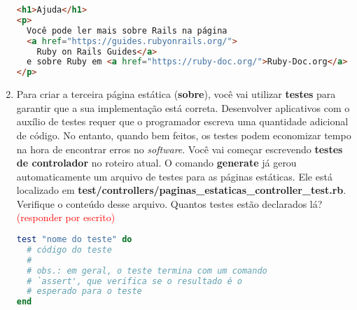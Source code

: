 \documentclass[a4paper,12pt]{article}
\begin{document}
\begin{enumerate}
  \pagebreak

  \begin{lstlisting}[language=html, title=app/views/paginas\_estaticas/ajuda.html.erb, basicstyle=\scriptsize]
<h1>Ajuda</h1>
<p>
  Você pode ler mais sobre Rails na página
  <a href="https://guides.rubyonrails.org/">
    Ruby on Rails Guides</a>
  e sobre Ruby em <a href="https://ruby-doc.org/">Ruby-Doc.org</a>
</p>
  \end{lstlisting}

  \item Para criar a terceira página estática (\textbf{sobre}), você vai utilizar \textbf{testes} para garantir que a sua implementação está correta. Desenvolver aplicativos com o auxílio de testes requer que o programador escreva uma quantidade adicional de código. No entanto, quando bem feitos, os testes podem economizar tempo na hora de encontrar erros no \textit{software}. Você vai começar escrevendo \textbf{testes de controlador} no roteiro atual. O comando \textbf{generate} já gerou automaticamente um arquivo de testes para as páginas estáticas. Ele está localizado em \textbf{test/controllers/paginas\_estaticas\_controller\_test.rb}. Verifique o conteúdo desse arquivo. Quantos testes estão declarados lá? \textcolor{red}{(responder por escrito)}

  \begin{lstlisting}[language=Ruby, title=Formato genérico para declaração de um teste]
test "nome do teste" do
  # código do teste
  #
  # obs.: em geral, o teste termina com um comando
  # `assert', que verifica se o resultado é o
  # esperado para o teste
end
  \end{lstlisting}


\end{enumerate}
\end{document}
